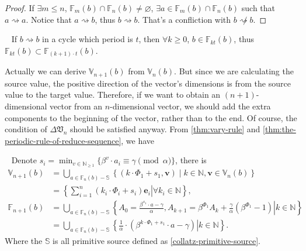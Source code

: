 \begin{proof}
    If $\exists m \le n$, $\mathbb{F}_{m}(b) \cap \mathbb{F}_{n}(b) \ne \varnothing$, $\exists a \in \mathbb{F}_{m}(b) \cap \mathbb{F}_{n}(b)$ such that $a \rightsquigarrow a$. Notice that $a \rightsquigarrow b$, thus $b\rightsquigarrow b$. That's a confliction with $b \not\rightsquigarrow b$.
\end{proof}
\begin{proposition}~\label{prop:cycle-layer-included}
If $b \rightsquigarrow b$ in a cycle which period is $t$, then $\forall k\ge 0$, $b \in \mathbb{F}_{kt}(b)$, thus $\mathbb{F}_{kt}(b)\subset \mathbb{F}_{(k+1)\cdot t}(b)$.
\end{proposition}

Actually we can derive $\mathbb{V}_{n+1}(b)$ from $\mathbb{V}_{n}(b)$.
But since we are calculating the source value, the positive direction of the vector's dimensions is from the source value to the target value.
Therefore, if we want to obtain an $(n+1)$-dimensional vector from an $n$-dimensional vector, we should add the extra components to the beginning of the vector, rather than to the end.
Of course, the condition of $\Delta\mathfrak{V}_{n}$ should be satisfied anyway.
From \cref{thm:vary-rule} and \cref{thm:the-periodic-rule-of-reduce-sequence}, we have
\begin{theorem}~\label{thm:layers-of-reduce-space-and-source-value-set}
    Denote $s_i = \min_{v\in\mathbb{N}_{\ge1}}\{\beta^{v}\cdot a_i \equiv \gamma\pmod{\alpha}\}$, there is
    \begin{align*}
        \mathbb{V}_{n+1}(b) &= \bigcup_{a\in \mathbb{F}_{n}(b) - \mathbb{S}} \left\{ (k\cdot \Phi_1 + s_1, \bm{v}) \mid  k\in \mathbb{N}, \bm{v} \in \mathbb{V}_{n}(b) \right\}\\
        &= \left\{ \left.\sum_{i=1}^{n}(k_i\cdot \Phi_i + s_i)\bm{e}_{i} \right\vert  \forall k_i\in \mathbb{N} \right\},\\
        \mathbb{F}_{n+1}(b) &= \bigcup_{a\in \mathbb{F}_{n}(b) - \mathbb{S}} \left\{\left. A_0 = \frac{\beta^{s_1}\cdot a  - \gamma}{\alpha}, A_{k+1} = \beta^{\Phi_1} A_{k} + \frac{\gamma}{\alpha}(\beta^{\Phi_1} - 1) \right\vert k\in\mathbb{N}\right\} \\
        &= \bigcup_{a\in \mathbb{F}_{n}(b) - \mathbb{S}} \left\{\left.\frac{1}{\alpha}\cdot (\beta^{k\cdot \Phi_1 + s_1}\cdot a - \gamma)\right\vert k\in \mathbb{N}\right\}.
    \end{align*}
    Where the $\mathbb{S}$ is all primitive source defined as \cref{collatz-primitive-source}.
\end{theorem}
